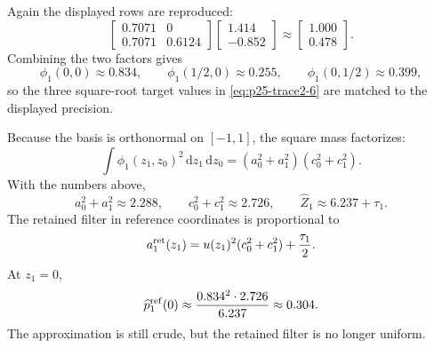 \documentclass[11pt]{article}
\numberwithin{equation}{section}
\newcommand{\dd}{\,\mathrm d}
\begin{document}
Again the displayed rows are reproduced:
\begin{equation}
    \begin{bmatrix}
    0.7071 & 0\\
    0.7071 & 0.6124
    \end{bmatrix}
    \begin{bmatrix}1.414\\-0.852\end{bmatrix}
    \approx
    \begin{bmatrix}1.000\\0.478\end{bmatrix}.
    \label{eq:p25-trace2-12a}
\end{equation}
Combining the two factors gives
\begin{equation}
    \phi_1(0,0)\approx0.834,\qquad
    \phi_1(1/2,0)\approx0.255,\qquad
    \phi_1(0,1/2)\approx0.399,
    \label{eq:p25-trace2-residual-check}
\end{equation}
so the three square-root target values in \eqref{eq:p25-trace2-6} are matched
to the displayed precision.

Because the basis is orthonormal on \([-1,1]\), the square mass factorizes:
\begin{equation}
    \int\phi_1(z_1,z_0)^2\dd z_1\dd z_0
    =
    (a_0^2+a_1^2)(c_0^2+c_1^2).
    \label{eq:p25-trace2-13}
\end{equation}
With the numbers above,
\begin{equation}
    a_0^2+a_1^2\approx2.288,
    \qquad
    c_0^2+c_1^2\approx2.726,
    \qquad
    \widehat Z_1\approx6.237+\tau_1.
    \label{eq:p25-trace2-14}
\end{equation}
The retained filter in reference coordinates is proportional to
\begin{equation}
    a_1^{\rm ret}(z_1)
    =
    u(z_1)^2(c_0^2+c_1^2)+\frac{\tau_1}{2}.
    \label{eq:p25-trace2-15}
\end{equation}
At \(z_1=0\),
\begin{equation}
    \widehat p_1^{\rm ref}(0)
    \approx
    \frac{0.834^2\cdot2.726}{6.237}
    \approx0.304.
    \label{eq:p25-trace2-16}
\end{equation}
The approximation is still crude, but the retained filter is no longer uniform.
\end{document}
